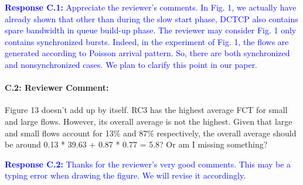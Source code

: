 \documentclass[12pt,one-column]{article}
\begin{document}
\noindent\textcolor{blue}{\textbf{Response C.1:} 
Appreciate the reviewer’s comments. 
In Fig. 1, we actually have already shown that other than during the slow start phase, DCTCP also contains spare bandwidth in queue build-up phase. The reviewer may consider Fig. 1 only contains synchronized bursts. Indeed, in the experiment of Fig. 1, the flows are generated according to Poisson arrival  pattern. So, there are both synchronized and nonsynchronized cases. We plan to clarify this point in our paper.
}


{\it \paragraph{C.2: Reviewer Comment:} Figure 13 doesn’t add up by itself. RC3 has the highest average FCT for small and large flows. However, its overall average is not the highest. Given that large and small flows account for 13\% and 87\% respectively, the overall average should be around 0.13 * 39.63 + 0.87 * 0.77 = 5.8? Or am I missing something?}


\noindent\textcolor{blue}{\textbf{Response C.2:}
Thanks for the reviewer’s very good comments. 
This may be a typing error when drawing the figure.
We will revise it accordingly.
}
\end{document}
